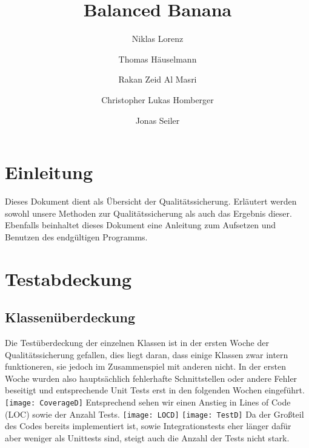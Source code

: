 \documentclass[a4paper,12pt]{article}
\title{Balanced Banana}
\author{Niklas Lorenz \and Thomas Häuselmann \and Rakan Zeid Al Masri \and Christopher Lukas Homberger \and Jonas Seiler}
\begin{document}
\setcounter{page}{2}
\tableofcontents          %
\clearpage
{}

\section{Einleitung}
\vspace{0.2cm}
Dieses Dokument dient als Übersicht der Qualitätssicherung. Erläutert werden sowohl unsere Methoden zur Qualitätssicherung als auch das Ergebnis dieser. Ebenfalls beinhaltet dieses Dokument eine Anleitung zum Aufsetzen und Benutzen des endgültigen Programms.
\section{Testabdeckung}
\subsection{Klassenüberdeckung}
\vspace{0.2cm}
Die Testüberdeckung der einzelnen Klassen ist in der ersten Woche der Qualitätssicherung gefallen, dies liegt daran, dass einige Klassen zwar intern funktioneren, sie jedoch im Zusammenspiel mit anderen nicht. In der ersten Woche wurden also hauptsächlich fehlerhafte Schnittstellen oder andere Fehler beseitigt und entsprechende Unit Tests erst in den folgenden Wochen eingeführt. \newline
\texttt{[image: CoverageD]} \newline
Entsprechend sehen wir einen Anstieg in Lines of Code (LOC) sowie der Anzahl Tests.
\texttt{[image: LOCD]} \newline
\texttt{[image: TestD]} \newline
Da der Großteil des Codes bereits implementiert ist, sowie Integrationstests eher länger dafür aber weniger als Unittests sind, steigt auch die Anzahl der Tests nicht stark.
\clearpage
\end{document}
